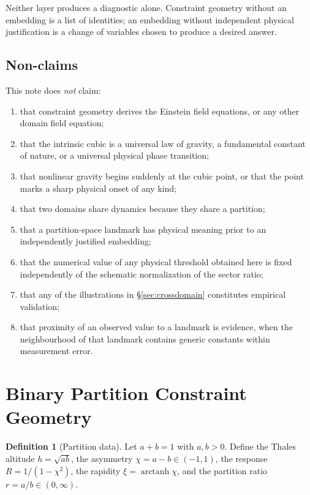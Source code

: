 \documentclass[11pt,a4paper]{article}
\theoremstyle{definition}
\newtheorem{definition}{Definition}[section]
\theoremstyle{plain}
\theoremstyle{remark}
\newcommand{\Rresp}{R}
\begin{document}
Neither layer produces a diagnostic alone. Constraint geometry without an
embedding is a list of identities; an embedding without independent physical
justification is a change of variables chosen to produce a desired answer.

\subsection{Non-claims}
\label{sec:nonclaims}

This note does \emph{not} claim:
\begin{enumerate}[label=(N\arabic*),leftmargin=*]
\item that constraint geometry derives the Einstein field equations, or any
      other domain field equation;
\item that the intrinsic cubic is a universal law of gravity, a fundamental
      constant of nature, or a universal physical phase transition;
\item that nonlinear gravity begins suddenly at the cubic point, or that the
      point marks a sharp physical onset of any kind;
\item that two domains share dynamics because they share a partition;
\item that a partition-space landmark has physical meaning prior to an
      independently justified embedding;
\item that the numerical value of any physical threshold obtained here is
      fixed independently of the schematic normalization of the sector ratio;
\item that any of the illustrations in \S\ref{sec:crossdomain} constitutes
      empirical validation;
\item that proximity of an observed value to a landmark is evidence, when the
      neighbourhood of that landmark contains generic constants within
      measurement error.
\end{enumerate}

\section{Binary Partition Constraint Geometry}
\label{sec:geometry}

\begin{definition}[Partition data]
Let $a+b=1$ with $a,b>0$. Define the Thales altitude $h=\sqrt{ab}$, the
asymmetry $\chi=a-b\in(-1,1)$, the response $\Rresp=1/(1-\chi^{2})$, the
rapidity $\xi=\operatorname{arctanh}\chi$, and the partition ratio
$r=a/b\in(0,\infty)$.
\end{definition}
\end{document}
